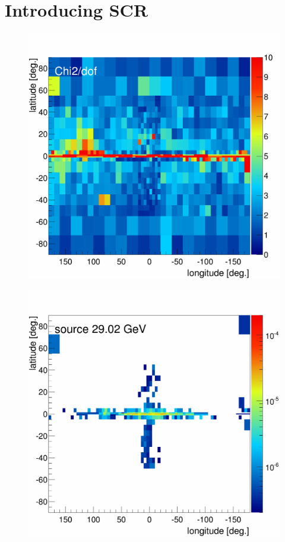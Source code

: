\section{Introducing SCR}

\begin{figure}[h]
  \centering
  \begin{minipage}[h]{0.45\textwidth}
  	\centering
	\includegraphics[width=1.\linewidth]{pic/results/SCRonly_Chi2Distribution.png}
  	\label{fig:SCRonly_fit}
  \end{minipage}
  \hfill
  \begin{minipage}[h]{0.45\textwidth}
	  \centering
	  \includegraphics[width=1.\linewidth]{pic/results/SCR_flux_distribution_bin20.png}

\end{minipage}
\end{figure}
